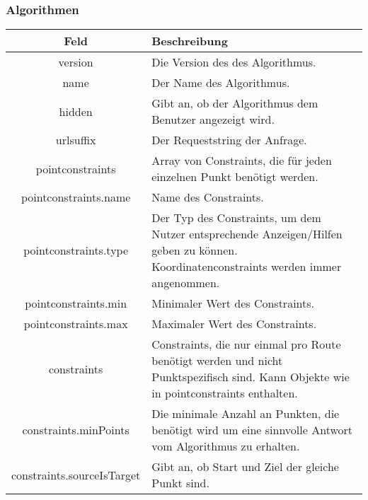 \documentclass[ngerman,titlepage,parskip=true]{scrartcl}
\begin{document}
    \subsubsection*{Algorithmen}
    
    \noindent \begin{tabular}{|c|p{11.5cm}|}
    	\hline
    	\textbf{Feld} & \textbf{Beschreibung} \\ 
    	\hline \hline
    	
    	version & Die Version des des Algorithmus. \\ 
    	\hline
    	
    	name & Der Name des Algorithmus. \\
    	\hline
    	
    	hidden & Gibt an, ob der Algorithmus dem Benutzer angezeigt wird. \\
    	\hline
    	
    	urlsuffix & Der Requeststring der Anfrage. \\
    	\hline
    	
    	pointconstraints & Array von Constraints, die für jeden einzelnen Punkt benötigt werden. \\
    	\hline
    	
    	pointconstraints.name & Name des Constraints. \\
    	\hline
    	
    	pointconstraints.type & Der Typ des Constraints, um dem Nutzer entsprechende Anzeigen/Hilfen geben zu können. Koordinatenconstraints werden immer angenommen.\\ 
    	\hline
    	
    	pointconstraints.min & Minimaler Wert des Constraints. \\
    	\hline
    	
    	pointconstraints.max & Maximaler Wert des Constraints. \\
    	\hline
    	
    	constraints & Constraints, die nur einmal pro Route benötigt werden und nicht Punktspezifisch sind. Kann Objekte wie in pointconstraints enthalten. \\
    	\hline
    	
    	constraints.minPoints & Die minimale Anzahl an Punkten, die benötigt wird um eine sinnvolle Antwort vom Algorithmus zu erhalten.\\ 
		\hline
		
		constraints.sourceIsTarget & Gibt an, ob Start und Ziel der gleiche Punkt sind.\\    		\hline    		
   	\end{tabular}
   	\clearpage
\end{document}
